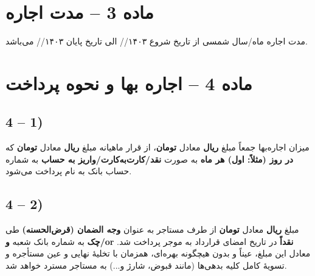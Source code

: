\documentclass[14pt]{article}
\begin{document}
	\section*{ماده 3 – مدت اجاره}
	مدت اجاره
	\underline{\hspace{2cm}} ماه/سال شمسی از تاریخ شروع ۱۴۰۳/\underline{\hspace{.5cm}}/\underline{\hspace{.5cm}} الی تاریخ پایان ۱۴۰۳/\underline{\hspace{.5cm}}/\underline{\hspace{.5cm}} می‌باشد.
	
	\section*{ماده 4 – اجاره بها و نحوه پرداخت}
	\subsection*{4 – 1)}
	میزان اجاره‌بها جمعاً مبلغ
	\underline{\hspace{2.5cm}}
	\textbf{ریال} معادل
	\underline{\hspace{2.5cm}}
	\textbf{تومان}، از قرار ماهیانه مبلغ
	\underline{\hspace{2.5cm}}
	\textbf{ریال} معادل
	\underline{\hspace{2.5cm}}
	\textbf{تومان} که
	\textbf{در روز
	\underline{\hspace{2cm}}
		 (مثلاً: اول) هر ماه} به صورت
	\textbf{نقد/کارت‌به‌کارت/واریز به حساب} به شماره حساب
	\underline{\hspace{3cm}}
	 بانک
	\underline{\hspace{1cm}}
	 به نام
	\underline{\hspace{2cm}}
	 پرداخت می‌شود.
	\subsection*{4 – 2)}
	مبلغ
	\underline{\hspace{2.5cm}}
	\textbf{ریال} معادل
	\underline{\hspace{2.5cm}}
	\textbf{تومان} از طرف مستاجر به عنوان
	\textbf{وجه الضمان (قرض‌الحسنه)} طی
	\textbf{چک} به شماره
	\underline{\hspace{2cm}} بانک
	\underline{\hspace{1cm}} شعبه
	\underline{\hspace{1cm}}
	\textbf{و/or}
	\textbf{نقداً} در تاریخ امضای قرارداد به موجر پرداخت شد. معادل این مبلغ، عیناً و بدون هیچگونه بهره‌ای، همزمان با تخلیهٔ نهایی و عین مستأجره و تسویهٔ کامل کلیه بدهی‌ها (مانند قبوض، شارژ و...) به مستاجر مسترد خواهد شد.
	
\end{document}
